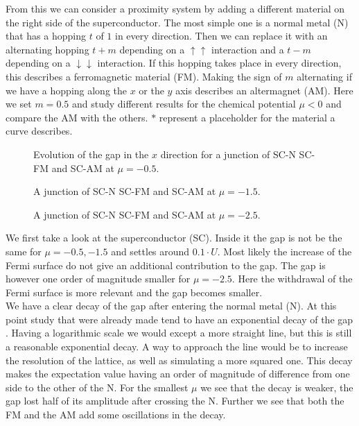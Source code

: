 \documentclass[..\main.tex]{subfile}
\begin{document}
From this we can consider a proximity system by adding a different material on the right side of the superconductor. 
The most simple one is a normal metal (N) that has a hopping $t$ of $1$ in every direction.
Then we can replace it with an alternating hopping $t+m$ depending on a $\uparrow\uparrow$ interaction
and a $t-m$ depending on a $\downarrow\downarrow$ interaction. If this hopping takes place in every direction, this describes a ferromagnetic material (FM).
Making the sign of $m$ alternating if we have a hopping along the $x$ or the $y$ axis describes an altermagnet (AM).
Here we set $m=0.5$ and study different results for the chemical potential $\mu<0$ and compare the AM
with the others. $\ast$ represent a placeholder for the material a curve describes.\\
\begin{figure}[H]
  \centering
  
  \caption{Evolution of the gap in the $x$ direction for a junction of SC-N SC-FM and SC-AM at $\mu=-0.5$.}
  \label{fig:SC_START_Mu-0.5}
\end{figure}\begin{figure}[H]
  \centering
  
  \caption{A junction of SC-N SC-FM and SC-AM at $\mu=-1.5$.}
  \label{fig:SC_START_Mu-1.5}
\end{figure}
\begin{figure}[H]
  \centering
  
  \caption{A junction of SC-N SC-FM and SC-AM at $\mu=-2.5$.}
    \label{fig:SC_START_Mu-2.5}
\end{figure}
We first take a look at the superconductor (SC). Inside it the gap is not be the same for $\mu=-0.5,-1.5$
and settles around $0.1\cdot U$. Most likely the increase of the Fermi surface do not give an additional contribution to the gap.
The gap is however one order of magnitude smaller for $\mu=-2.5$. Here the withdrawal of the Fermi surface is more relevant and the 
gap becomes smaller.\\
We have a clear decay of the gap after entering the normal metal (N). At this point 
study that were already made tend to have an exponential decay of the gap \cite{Mjos2019}. Having a logarithmic scale we would
except a more straight line, but this is still a reasonable exponential decay. A way to approach the line would be to increase the 
resolution of the lattice, as well as simulating a more squared one. This decay makes the expectation value having an order of 
magnitude of difference from one side to the other of the N. For the smallest $\mu$ we see that the decay is weaker, the gap lost
half of its amplitude after crossing the N. Further we see that both the FM and the AM add some oscillations in the decay. \\
\end{document}

